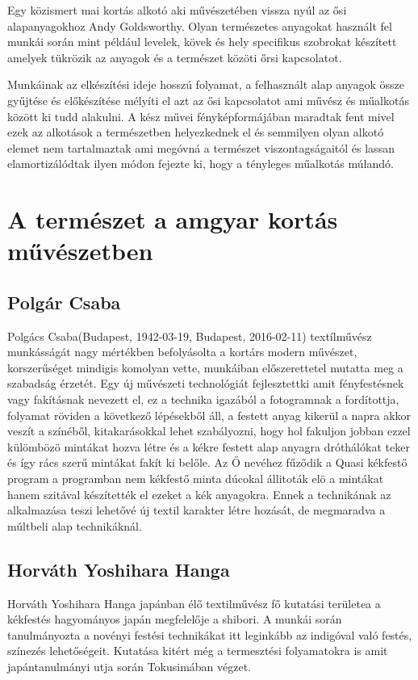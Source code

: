 \documentclass[fontsize=12pt, appendixprefix=true]{scrreprt}
\begin{document}
\vspace{3 mm}
Egy közismert mai kortás alkotó aki művészetében vissza nyúl az ősi alapanyagokhoz Andy Goldsworthy. Olyan természetes anyagokat használt fel munkái során mint például levelek, kövek és hely specifikus szobrokat készített amelyek tükrözik az anyagok és a természet közöti őrsi kapcsolatot.

Munkáinak az elkészítési ideje hosszú folyamat, a felhasznált alap anyagok össze gyűjtése és előkészítése mélyíti el azt az ősi kapcsolatot ami művész és műalkotás között ki tudd alakulni.
A kész művei fényképformájában maradtak fent mivel ezek az alkotások a természetben helyezkednek el és semmilyen olyan alkotó elemet nem tartalmaztak ami megóvná a természet viszontagságaitól és lassan elamortizálódtak ilyen módon fejezte ki, hogy a tényleges műalkotás múlandó.

\section{A természet a amgyar kortás művészetben}

\subsection{Polgár Csaba}
Polgács Csaba(Budapest, 1942-03-19, Budapest, 2016-02-11) textílművész munkásságát nagy mértékben befolyásolta a kortárs modern művészet, korszerűséget mindigis komolyan vette, munkáiban előszerettetel mutatta meg a szabadság érzetét.
Egy új művészeti technológiát fejlesztettki amit fényfestésnek vagy fakításnak nevezett el, ez a technika igazából a fotogramnak a fordítottja, folyamat röviden  a következő lépésekből áll, a festett anyag kikerül a napra akkor veszít a színéből, kitakarásokkal lehet szabályozni, hogy hol fakuljon jobban ezzel külömbözö mintákat hozva létre és a kékre festett alap anyagra dróthálókat teker és így rács szerű mintákat fakít ki belőle.
Az Ő nevéhez fűződik a Quasi kékfestő program  a programban nem  kékfestő minta dúcokal állitoták elö a mintákat hanem szitával készítették el ezeket a kék anyagokra. Ennek a technikának az alkalmazása teszi lehetővé új textil karakter létre hozását, de megmaradva a múltbeli alap technikáknál.

\subsection{Horváth Yoshihara Hanga} 
Horváth Yoshihara Hanga japánban élő textilművész fő kutatási területea a kékfestés hagyományos japán megfelelője a shibori.
A munkái során tanulmányozta a novényi festési technikákat itt leginkább az indigóval való festés, színezés lehetőségeit. Kutatása kitért még a termesztési folyamatokra is amit japántanulmányi utja során Tokusimában végzet.
\end{document}
